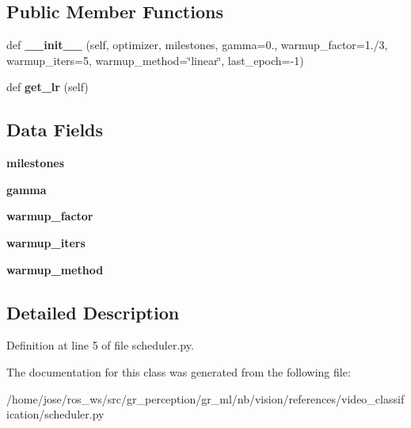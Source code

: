 \subsection*{Public Member Functions}
\begin{DoxyCompactItemize}
\item 
\mbox{\label{classscheduler_1_1WarmupMultiStepLR_a9815deb2e5609d5801f135313723be26}} 
def {\bfseries \+\_\+\+\_\+init\+\_\+\+\_\+} (self, optimizer, milestones, gamma=0., warmup\+\_\+factor=1./3, warmup\+\_\+iters=5, warmup\+\_\+method=\char`\"{}linear\char`\"{}, last\+\_\+epoch=-\/1)
\item 
\mbox{\label{classscheduler_1_1WarmupMultiStepLR_a2148e55af7569e2a722ebf4b434ff039}} 
def {\bfseries get\+\_\+lr} (self)
\end{DoxyCompactItemize}
\subsection*{Data Fields}
\begin{DoxyCompactItemize}
\item 
\mbox{\label{classscheduler_1_1WarmupMultiStepLR_ad81a20b62439b2748d8ae7796f54f531}} 
{\bfseries milestones}
\item 
\mbox{\label{classscheduler_1_1WarmupMultiStepLR_a6a46eb1cd02b5c0bbef43f8b136696f8}} 
{\bfseries gamma}
\item 
\mbox{\label{classscheduler_1_1WarmupMultiStepLR_a4ec2c168df11442ab9fcce24bebd13ac}} 
{\bfseries warmup\+\_\+factor}
\item 
\mbox{\label{classscheduler_1_1WarmupMultiStepLR_a27cb058173c6d51fe9787113372441d9}} 
{\bfseries warmup\+\_\+iters}
\item 
\mbox{\label{classscheduler_1_1WarmupMultiStepLR_a96e55a9710261179f7e5ceac9c11edb9}} 
{\bfseries warmup\+\_\+method}
\end{DoxyCompactItemize}


\subsection{Detailed Description}


Definition at line 5 of file scheduler.\+py.



The documentation for this class was generated from the following file\+:\begin{DoxyCompactItemize}
\item 
/home/jose/ros\+\_\+ws/src/gr\+\_\+perception/gr\+\_\+ml/nb/vision/references/video\+\_\+classification/scheduler.\+py\end{DoxyCompactItemize}
